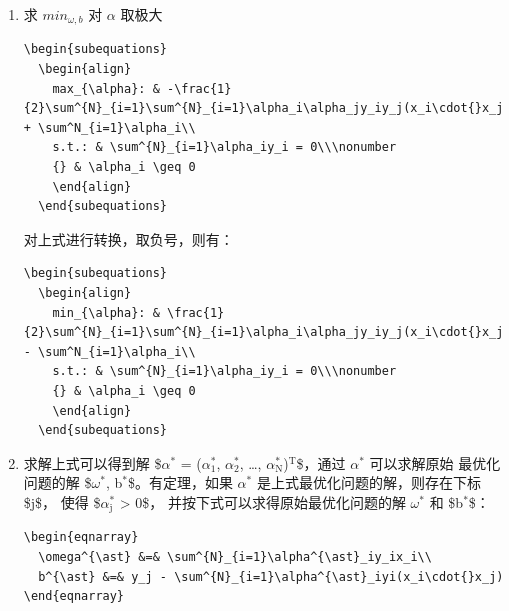 \documentclass[11pt]{ctexart}
\begin{document}
\begin{enumerate}
\begin{enumerate}
\begin{enumerate}
\begin{lstlisting}
  &=-\frac{1}{2}\sum^{N}_{i=1}\sum^{N}_{i=1}\alpha_i\alpha_jy_iy_j(x_i\cdot{}x_j)+\sum^{N}_{i=1}\alpha_i
\end{align*}
\end{lstlisting}
\item 求 \(min_{\omega, b}\) 对 \(\alpha\) 取极大
\lstset{language=[LaTeX]TeX,label= ,caption= ,captionpos=b,numbers=none}
\begin{lstlisting}
\begin{subequations}
  \begin{align}
    max_{\alpha}: & -\frac{1}{2}\sum^{N}_{i=1}\sum^{N}_{i=1}\alpha_i\alpha_jy_iy_j(x_i\cdot{}x_j) + \sum^N_{i=1}\alpha_i\\
    s.t.: & \sum^{N}_{i=1}\alpha_iy_i = 0\\\nonumber
    {} & \alpha_i \geq 0
    \end{align}
  \end{subequations}
\end{lstlisting}
对上式进行转换，取负号，则有：
\lstset{language=[LaTeX]TeX,label= ,caption= ,captionpos=b,numbers=none}
\begin{lstlisting}
\begin{subequations}
  \begin{align}
    min_{\alpha}: & \frac{1}{2}\sum^{N}_{i=1}\sum^{N}_{i=1}\alpha_i\alpha_jy_iy_j(x_i\cdot{}x_j) - \sum^N_{i=1}\alpha_i\\
    s.t.: & \sum^{N}_{i=1}\alpha_iy_i = 0\\\nonumber
    {} & \alpha_i \geq 0
    \end{align}
  \end{subequations}
\end{lstlisting}
\item 求解上式可以得到解 \$\(\alpha^{\text{*}}\) = (\(\alpha^{\ast}_{\text{1}}\), \(\alpha^{\ast}_{\text{2}}\), \ldots, \(\alpha^{\ast}_{\text{N}}\))\(^{\text{T}}\)\$，通过 \(\alpha^{\ast}\) 可以求解原始
最优化问题的解 \$\(\omega^{\ast}\), b\(^{\ast}\)\$。有定理，如果 \(\alpha^{\ast}\) 是上式最优化问题的解，则存在下标 \$j\$， 使得 \$\(\alpha^{\ast}_{\text{j}}\) > 0\$，
并按下式可以求得原始最优化问题的解 \(\omega^{\ast}\) 和 \$b\(^{\ast}\)\$：
\lstset{language=[LaTeX]TeX,label= ,caption= ,captionpos=b,numbers=none}
\begin{lstlisting}
\begin{eqnarray}
  \omega^{\ast} &=& \sum^{N}_{i=1}\alpha^{\ast}_iy_ix_i\\
  b^{\ast} &=& y_j - \sum^{N}_{i=1}\alpha^{\ast}_iyi(x_i\cdot{}x_j)
\end{eqnarray}

\end{lstlisting}
\end{enumerate}
\end{enumerate}
\end{enumerate}
\end{document}
